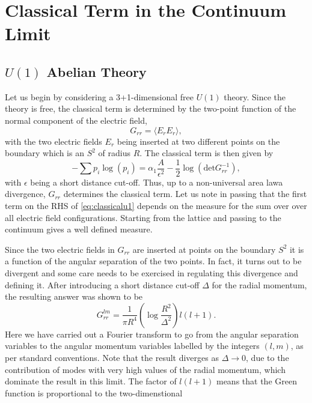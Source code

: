 \section{Classical Term in the Continuum Limit}
\subsection{$U(1)$ Abelian Theory}
Let us begin by considering a  3+1-dimensional free $U(1)$ theory. Since the
theory is free, the classical term is determined by the two-point function of
the normal component of the electric field,
\begin{equation}
  G_{rr} = \langle E_rE_r\rangle,
\end{equation}
with the two electric fields $E_r$ being inserted at two different points on
the boundary which is an $S^2$ of radius $R$. The classical term is then given
by
\begin{equation}
  -\sum p_i\log(p_i) = \alpha_1\frac{A}{\epsilon^2}
  - \frac{1}{2}\log(\mathrm{det}G^{-1}_{rr}),
  \label{eq:classicalu1}
\end{equation}
with $\epsilon$ being a short distance cut-off. Thus, up to a non-universal
area lawa divergence, $G_{rr}$ determines the classical term. Let us note in
passing that the first term on the RHS of \eqref{eq:classicalu1} depends on the
measure for the sum over over all electric field configurations. Starting from
the lattice and passing to the continuum gives a well defined measure.
\par Since the two electric fields in $G_{rr}$ are inserted at points on the
boundary $S^2$ it is a function of the angular separation of the two points.
In fact, it turns out to be divergent and some care needs to be exercised in 
regulating this divergence and defining it. After introducing a short distance
cut-off $\Delta$ for the radial momentum, the resulting answer was shown to be
\begin{equation}
  G_{rr}^{lm} = \frac{1}{\pi R^4}\left(\log\frac{R^2}{\Delta^2}\right)l(l+1).
\end{equation}
Here we have carried out a Fourier transform to go from the angular separation
variables to the angular momentum variables labelled by the integers $(l,m)$,
as per standard conventions. Note that the result diverges as
$\Delta\rightarrow 0$, due to the contribution of modes with very high values
of the radial momentum, which dominate the result in this limit. The factor of
$l(l+1)$ means that the Green function is proportional to the two-dimenstional

